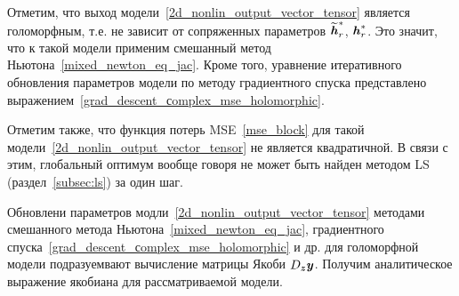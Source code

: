 Отметим, что выход модели~\eqref{2d_nonlin_output_vector_tensor} является голоморфным, т.е. не зависит от сопряженных параметров $\widetilde{\textbf{\textit{h}}}_r^*$, $\textbf{\textit{h}}_r^*$. Это значит, что к такой модели применим смешанный метод Ньютона~\eqref{mixed_newton_eq_jac}. Кроме того, уравнение итеративного обновления параметров модели по методу градиентного спуска представлено выражением~\eqref{grad_descent_сomplex_mse_holomorphic}.

Отметим также, что функция потерь MSE~\eqref{mse_block} для такой модели~\eqref{2d_nonlin_output_vector_tensor} не является квадратичной. В связи с этим, глобальный оптимум вообще говоря не может быть найден методом LS (раздел~\ref{subsec:ls}) за один шаг.

Обновлени параметров модли~\eqref{2d_nonlin_output_vector_tensor} методами смешанного метода Ньютона~\eqref{mixed_newton_eq_jac}, градиентного спуска~\eqref{grad_descent_сomplex_mse_holomorphic} и др. для голоморфной модели подразуемвают вычисление матрицы Якоби $D_{\textbf{\textit{z}}}\textbf{\textit{y}}$. Получим аналитическое выражение якобиана для рассматриваемой модели.

